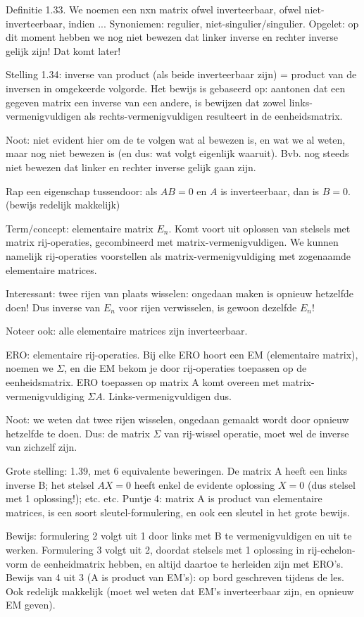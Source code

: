 \documentclass{article}
\begin{document}
Definitie 1.33. We noemen een nxn matrix ofwel inverteerbaar, ofwel niet-inverteerbaar, indien ... Synoniemen: regulier, niet-singulier/singulier. Opgelet: op dit moment hebben we nog niet bewezen dat linker inverse en rechter inverse gelijk zijn! Dat komt later! 

Stelling 1.34: inverse van product (als beide inverteerbaar zijn) =  product van de inversen in omgekeerde volgorde. Het bewijs is gebaseerd op: aantonen dat een gegeven matrix een inverse van een andere, is bewijzen dat zowel links-vermenigvuldigen als rechts-vermenigvuldigen resulteert in de eenheidsmatrix. 

Noot: niet evident hier om de te volgen wat al bewezen is, en wat we al weten, maar nog niet bewezen is (en dus: wat volgt eigenlijk waaruit). Bvb. nog steeds niet bewezen dat linker en rechter inverse gelijk gaan zijn. 

Rap een eigenschap tussendoor: als $AB=0$ en $A$ is inverteerbaar, dan is $B=0$. (bewijs redelijk makkelijk) 

Term/concept: elementaire matrix $E_n$. Komt voort uit oplossen van stelsels met matrix rij-operaties, gecombineerd met matrix-vermenigvuldigen. We kunnen namelijk rij-operaties voorstellen als matrix-vermenigvuldiging met zogenaamde elementaire matrices. 

Interessant: twee rijen van plaats wisselen: ongedaan maken is opnieuw hetzelfde doen! Dus inverse van $E_n$ voor rijen verwisselen, is gewoon dezelfde $E_n$! 

Noteer ook: alle elementaire matrices zijn inverteerbaar. 

ERO: elementaire rij-operaties. Bij elke ERO hoort een EM (elementaire matrix), noemen we $\Sigma$, en die EM bekom je door rij-operaties toepassen op de eenheidsmatrix. ERO toepassen op matrix A komt overeen met matrix-vermenigvuldiging $\Sigma A$. Links-vermenigvuldigen dus. 

Noot: we weten dat twee rijen wisselen, ongedaan gemaakt wordt door opnieuw hetzelfde te doen. Dus: de matrix $\Sigma$ van rij-wissel operatie, moet wel de inverse van zichzelf zijn. 

Grote stelling: 1.39, met 6 equivalente beweringen. De matrix A heeft een links inverse B; het stelsel $AX=0$ heeft enkel de evidente oplossing $X=0$ (dus stelsel met 1 oplossing!); etc. etc. Puntje 4: matrix A is product van elementaire matrices, is een soort sleutel-formulering, en ook een sleutel in het grote bewijs. 

Bewijs: formulering 2 volgt uit 1 door links met B te vermenigvuldigen en uit te werken. Formulering 3 volgt uit 2, doordat stelsels met 1 oplossing in rij-echelon-vorm de eenheidmatrix hebben, en altijd daartoe te herleiden zijn met ERO's. Bewijs van 4 uit 3 (A is product van EM's): op bord geschreven tijdens de les. Ook redelijk makkelijk (moet wel weten dat EM's inverteerbaar zijn, en opnieuw EM geven). 
\end{document}
